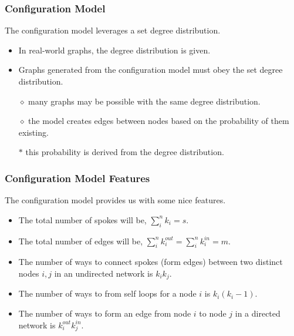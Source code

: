 \documentclass{beamer}
\newcommand{\ds}{\displaystyle}
\begin{document}
\begin{frame}

    \frametitle{Configuration Model}

    The configuration model leverages a set degree distribution.\pause

    \vspace{2.5mm}
    \begin{itemize}
        \item In real-world graphs, the degree distribution is given.\pause
        \item Graphs generated from the configuration model must obey the set degree distribution.\pause
        \item[$\diamond$] many graphs may be possible with the same degree distribution.\pause
        \item[$\diamond$] the model creates edges between nodes based on the probability of them existing.\pause
        \item[$\ast$] this probability is derived from the degree distribution.  
    \end{itemize}

\end{frame}

\begin{frame}

    \frametitle{Configuration Model Features}

    The configuration model provides us with some nice features.\pause

    \vspace{2.5mm}
    \begin{itemize}
        \item The total number of spokes will be, $ \ds \sum_{i}^{n} k_{i} = s $.\pause
        \item The total number of edges will be, $ \ds \sum_{i}^{n} k_{i}^{out} = \sum_{i}^{n} k_{i}^{in} = m $.\pause
        \item The number of ways to connect spokes (form edges) between two distinct nodes $ i,j $ in an undirected network is $ \ds k_{i} k_{j} $.\pause
        \item The number of ways to from self loops for a node $ i $ is $ \ds k_{i}(k_{i} - 1) $. \pause
        \item The number of ways to form an edge from node $ i $ to node $ j $ in a directed network is $ \ds k_{i}^{out} k_{j}^{in} $.
    \end{itemize}


\end{frame}
\end{document}
